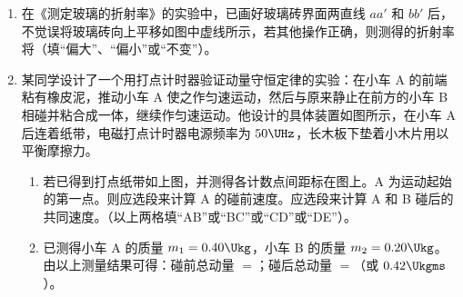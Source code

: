 \documentclass[\gkver]{gaokaozhenti}
\begin{document}
\begin{enumerate}

\item
在《测定玻璃的折射率》的实验中，已画好玻璃砖界面两直线 $aa'$ 和 $bb'$ 后，不觉误将玻璃砖向上平移如图中虚线所示，若其他操作正确，则测得的折射率将（填“偏大”、“偏小”或“不变”）。
\onepicture[align=right, w=4.48cm]{}



\item
某同学设计了一个用打点计时器验证动量守恒定律的实验：在小车 A 的前端粘有橡皮泥，推动小车 A 使之作匀速运动，然后与原来静止在前方的小车 B 相碰并粘合成一体，继续作匀速运动。他设计的具体装置如图所示，在小车 A 后连着纸带，电磁打点计时器电源频率为 $50\UHz$，长木板下垫着小木片用以平衡摩擦力。
\begin{enumerate}
	\item
	若已得到打点纸带如上图，并测得各计数点间距标在图上。A 为运动起始的第一点。则应选段来计算 A 的碰前速度。应选段来计算 A 和 B 碰后的共同速度。（以上两格填“AB”或“BC”或“CD”或“DE”）。
	\item
	已测得小车 A 的质量 $m_{1} = 0.40\Ukg$，小车 B 的质量 $m_{2} = 0.20\Ukg$。由以上测量结果可得：碰前总动量 $=$\tkanswer[2.2cm]{$0.42\Ukgms$}；碰后总动量 $=$\tkanswer[2.2cm]{$0.417\Ukgms$}（或 $0.42\Ukgms$）。
\end{enumerate}
\onepicture[align=right, w=12.00cm]{}




\end{enumerate}
\end{document}
